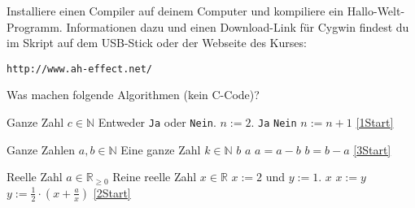 \documentclass{uebungszettel}
\begin{document}
\begin{aufg}
Installiere einen Compiler auf deinem Computer und kompiliere ein Hallo-Welt-Programm. Informationen dazu und einen Download-Link für Cygwin findest du im Skript auf dem USB-Stick oder der Webseite des Kurses:
\begin{center}
	\verb|http://www.ah-effect.net/ |
\end{center}
\end{aufg}

\begin{aufg}
Was machen folgende Algorithmen (kein C-Code)?

\begin{algorithm}[H]
\caption{}
\begin{algorithmic}[1]
\REQUIRE Ganze Zahl $c\in\mathbb{N}$
\ENSURE Entweder \verb|Ja| oder \verb|Nein|.
\STATE \SET $n := 2$.
 \label{1Start}
\RETURN \verb|Ja|
\ENDIF
{}
\RETURN \verb|Nein|
\ENDIF
\STATE \SET $n := n + 1$
\STATE \GOTO \ref{1Start}
\end{algorithmic}
\end{algorithm}

\begin{algorithm}[H]
\caption{}
\begin{algorithmic}[1]
\REQUIRE Ganze Zahlen $a,b\in\mathbb{N}$
\ENSURE Eine ganze Zahl $k\in\mathbb{N}$
\RETURN $b$
\ENDIF
{} \label{3Start}
\RETURN $a$
\ENDIF
{}
\STATE \SET $a = a - b$
\ELSE 
\STATE \SET $b = b - a$
\ENDIF
\STATE \GOTO \ref{3Start}
\end{algorithmic}
\end{algorithm}

\begin{algorithm}[H]
\caption{}
\begin{algorithmic}[1]
\REQUIRE Reelle Zahl $a\in\mathbb{R}_{\ge 0}$
\ENSURE Reine reelle Zahl $x\in\mathbb{R}$
\STATE \SET $x := 2$ und $y := 1$.
 \label{2Start} 
\RETURN $x$
\ENDIF
\STATE \SET $x := y$
\STATE \SET $y := \frac{1}{2} \cdot \left(x+\frac{a}{x}\right)$
\STATE \GOTO \ref{2Start}
\end{algorithmic}
\end{algorithm}
\end{aufg}
\end{document}
